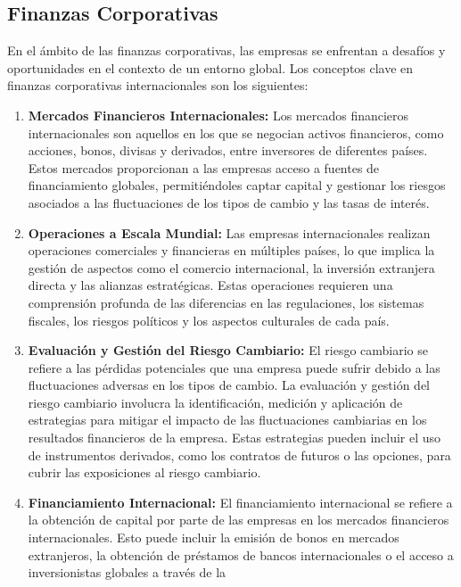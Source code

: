 \documentclass[
  jou,
  floatsintext,
  longtable,
  a4paper,
  nolmodern,
  notxfonts,
  notimes,
  12pt,
  colorlinks=true,linkcolor=blue,citecolor=blue,urlcolor=blue]{apa7}
\begin{document}
\subsection{Finanzas Corporativas}\label{finanzas-corporativas}

En el ámbito de las finanzas corporativas, las empresas se enfrentan a
desafíos y oportunidades en el contexto de un entorno global. Los
conceptos clave en finanzas corporativas internacionales son los
siguientes:

\begin{enumerate}
\def\labelenumi{\arabic{enumi}.}
\item
  \textbf{Mercados Financieros Internacionales:} Los mercados
  financieros internacionales son aquellos en los que se negocian
  activos financieros, como acciones, bonos, divisas y derivados, entre
  inversores de diferentes países. Estos mercados proporcionan a las
  empresas acceso a fuentes de financiamiento globales, permitiéndoles
  captar capital y gestionar los riesgos asociados a las fluctuaciones
  de los tipos de cambio y las tasas de interés.
\item
  \textbf{Operaciones a Escala Mundial:} Las empresas internacionales
  realizan operaciones comerciales y financieras en múltiples países, lo
  que implica la gestión de aspectos como el comercio internacional, la
  inversión extranjera directa y las alianzas estratégicas. Estas
  operaciones requieren una comprensión profunda de las diferencias en
  las regulaciones, los sistemas fiscales, los riesgos políticos y los
  aspectos culturales de cada país.
\item
  \textbf{Evaluación y Gestión del Riesgo Cambiario:} El riesgo
  cambiario se refiere a las pérdidas potenciales que una empresa puede
  sufrir debido a las fluctuaciones adversas en los tipos de cambio. La
  evaluación y gestión del riesgo cambiario involucra la identificación,
  medición y aplicación de estrategias para mitigar el impacto de las
  fluctuaciones cambiarias en los resultados financieros de la empresa.
  Estas estrategias pueden incluir el uso de instrumentos derivados,
  como los contratos de futuros o las opciones, para cubrir las
  exposiciones al riesgo cambiario.
\item
  \textbf{Financiamiento Internacional:} El financiamiento internacional
  se refiere a la obtención de capital por parte de las empresas en los
  mercados financieros internacionales. Esto puede incluir la emisión de
  bonos en mercados extranjeros, la obtención de préstamos de bancos
  internacionales o el acceso a inversionistas globales a través de la

\end{enumerate}
\end{document}

